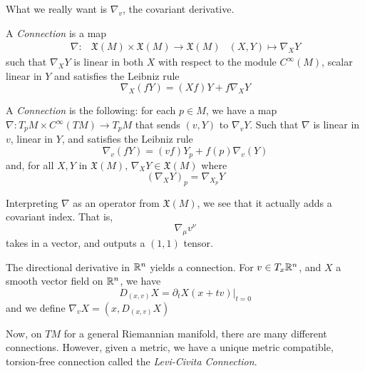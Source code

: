 \documentclass[../main.tex]{subfiles}
\begin{document}
What we really want is $\nabla_v$, the covariant derivative.

\begin{defn}
    A {\em Connection} is a map
    \[
        \begin{aligned}
            \nabla: &\mathfrak{X}(M)\times \mathfrak{X}(M)\to\mathfrak{X}(M)
            &(X,Y)\mapsto \nabla_XY
        \end{aligned}
    \]
    such that $\nabla_XY$ is linear in both $X$ with respect to the module
    $C^{\infty}(M)$, scalar linear in $Y$ and satisfies the Leibniz rule
    \[
        \nabla_X(fY) = (Xf)Y + f\nabla_XY
    \]
\end{defn}
\begin{defn}
    A {\em Connection} is the following: for each $p\in M$, we have a map
    $\nabla: T_pM\times C^{\infty}(TM)\to T_pM$ that sends $(v,Y)$ to
    $\nabla_vY$. Such that $\nabla$ is linear in $v$, linear in $Y$, and
    satisfies the Leibniz rule
    \[
        \nabla_v(fY) = (vf)Y_p + f(p)\nabla_v(Y)
    \]
    and, for all $X,Y$ in $\mathfrak{X}(M)$, $\nabla_XY\in\mathfrak{X}(M)$ where
    \[
        (\nabla_XY)_p = \nabla_{X_p}Y
    \]
\end{defn}

Interpreting $\nabla$ as an operator from $\mathfrak{X}(M)$, we see that it
actually adds a covariant index. That is,
\[
    \nabla_{\mu}v^{\nu}
\]
takes in a vector, and outputs a $(1,1)$ tensor.

\begin{ex}
    The directional derivative in $\mathbb{R}^n$ yields a connection. For $v\in
    T_x\mathbb{R}^n$, and $X$ a smooth vector field on $\mathbb{R}^n$, we have
    \[
        D_{(x,v)}X = \partial_tX(x+tv)|_{t=0}
    \]
    and we define $\nabla_vX = (x,D_{(x,v)}X)$
\end{ex}

Now, on $TM$ for a general Riemannian manifold, there are many different
connections. However, given a metric, we have a unique metric compatible,
torsion-free connection called the {\em Levi-Civita Connection}.
\end{document}
